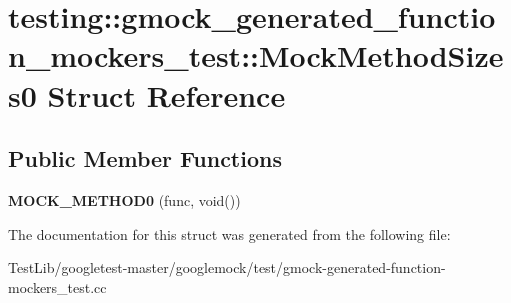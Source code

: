 \hypertarget{structtesting_1_1gmock__generated__function__mockers__test_1_1MockMethodSizes0}{}\section{testing\+:\+:gmock\+\_\+generated\+\_\+function\+\_\+mockers\+\_\+test\+:\+:Mock\+Method\+Sizes0 Struct Reference}
\label{structtesting_1_1gmock__generated__function__mockers__test_1_1MockMethodSizes0}
\subsection*{Public Member Functions}
\begin{DoxyCompactItemize}
\item 
\mbox{\label{structtesting_1_1gmock__generated__function__mockers__test_1_1MockMethodSizes0_ad72a29f7a84b94e60a6697952d086ec9}} 
{\bfseries M\+O\+C\+K\+\_\+\+M\+E\+T\+H\+O\+D0} (func, void())
\end{DoxyCompactItemize}


The documentation for this struct was generated from the following file\+:\begin{DoxyCompactItemize}
\item 
Test\+Lib/googletest-\/master/googlemock/test/gmock-\/generated-\/function-\/mockers\+\_\+test.\+cc\end{DoxyCompactItemize}
